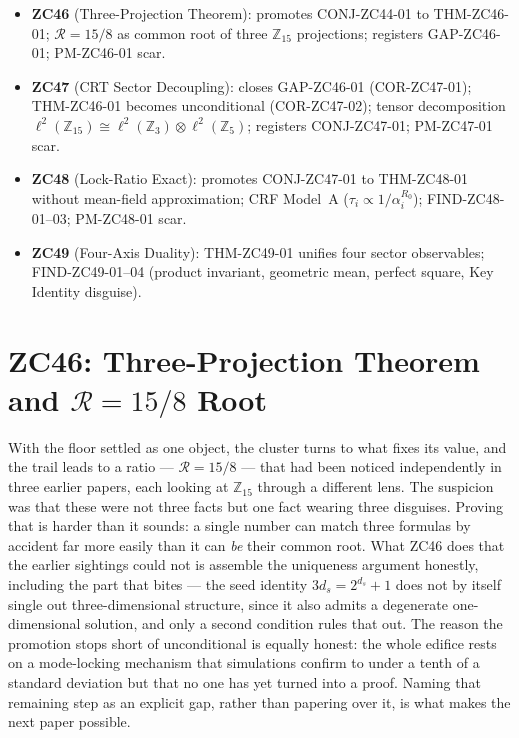 \documentclass[12pt, a4paper]{article}
\begin{document}
\begin{keybox}[title={Part XXXVI Overview}]
\begin{itemize}[leftmargin=1.5em]
\item \textbf{ZC46} (Three-Projection Theorem): promotes CONJ-ZC44-01
  to THM-ZC46-01; $\mathcal{R}=15/8$ as common root of three
  $\mathbb{Z}_{15}$ projections; registers GAP-ZC46-01; PM-ZC46-01 scar.
\item \textbf{ZC47} (CRT Sector Decoupling): closes GAP-ZC46-01
  (COR-ZC47-01); THM-ZC46-01 becomes unconditional (COR-ZC47-02);
  tensor decomposition $\ell^2(\mathbb{Z}_{15}) \cong
  \ell^2(\mathbb{Z}_3) \otimes \ell^2(\mathbb{Z}_5)$; registers
  CONJ-ZC47-01; PM-ZC47-01 scar.
\item \textbf{ZC48} (Lock-Ratio Exact): promotes CONJ-ZC47-01 to
  THM-ZC48-01 without mean-field approximation; CRF Model~A
  ($\tau_i \propto 1/\alpha_i^{R_0}$); FIND-ZC48-01--03;
  PM-ZC48-01 scar.
\item \textbf{ZC49} (Four-Axis Duality): THM-ZC49-01 unifies four
  sector observables; FIND-ZC49-01--04 (product invariant, geometric
  mean, perfect square, Key Identity disguise).
\end{itemize}
\end{keybox}

\section{ZC46: Three-Projection Theorem and $\mathcal{R}=15/8$ Root}
\label{sec:zc46}

With the floor settled as one object, the cluster turns to what fixes its
value, and the trail leads to a ratio --- $\mathcal{R}=15/8$ --- that had been
noticed independently in three earlier papers, each looking at $\mathbb{Z}_{15}$
through a different lens. The suspicion was that these were not three facts but
one fact wearing three disguises. Proving that is harder than it sounds: a
single number can match three formulas by accident far more easily than it can
\emph{be} their common root. What ZC46 does that the earlier sightings could
not is assemble the uniqueness argument honestly, including the part that bites
--- the seed identity $3d_s = 2^{d_s}+1$ does not by itself single out
three-dimensional structure, since it also admits a degenerate one-dimensional
solution, and only a second condition rules that out. The reason the promotion
stops short of unconditional is equally honest: the whole edifice rests on a
mode-locking mechanism that simulations confirm to under a tenth of a standard
deviation but that no one has yet turned into a proof. Naming that remaining
step as an explicit gap, rather than papering over it, is what makes the next
paper possible.
\end{document}
